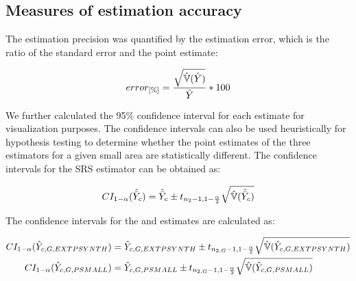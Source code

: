 \subsection{Measures of estimation accuracy}

The estimation precision was quantified by the estimation error, which is the ratio of the standard error and the point estimate:

\begin{equation}\label{eq:error}
error_{[\%]}=\frac{\sqrt{\hat{\mathbb{V}}(\hat{Y})}}{\hat{Y}}*100
\end{equation}

We further calculated the 95\% confidence interval for each estimate for visualization purposes. The confidence intervals can also be used heuristically for hypothesis testing to determine whether the point estimates of the three estimators for a given small area are statistically different. The confidence intervals for the SRS estimator can be obtained as:


\begin{equation}\label{ci_1phase}
CI_{1-\alpha}(\hat{\bar{Y}}_c)=\hat{\bar{Y}}_c \pm t_{n_{2}-1, 1-\frac{\alpha}{2}}\sqrt{\hat{\mathbb{V}}(\hat{\bar{Y}}_c)}
\end{equation}


The confidence intervals for the \psmall{} and \extpsynth{} estimates are calculated as:


\begin{subequations}\label{ci_2phase_sae}
	\begin{align}
	CI_{1-\alpha}(\hat{Y}_{c,G,EXTPSYNTH})&=\hat{Y}_{c,G,EXTPSYNTH} \pm t_{n_{2,G}-1, 1-\frac{\alpha}{2}}\sqrt{\hat{\mathbb{V}}(\hat{Y}_{c,G,EXTPSYNTH})} \\
	CI_{1-\alpha}(\hat{Y}_{c,G,PSMALL})&=\hat{Y}_{c,G,PSMALL} \pm t_{n_{2,G}-1, 1-\frac{\alpha}{2}}\sqrt{\hat{\mathbb{V}}(\hat{Y}_{c,G,PSMALL})}
	\end{align}
\end{subequations}



